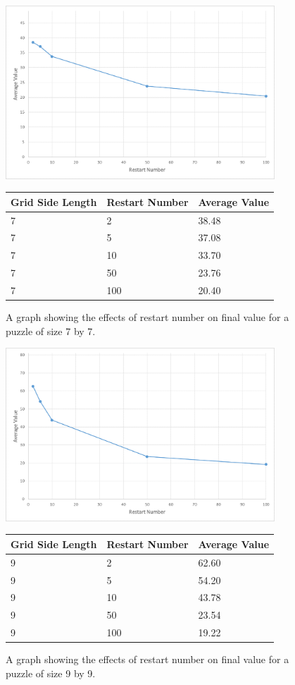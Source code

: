 \documentclass[12pt]{article}
\begin{document}
\begin{figure}[H]
    \centering
    \includegraphics[width=0.9\textwidth]{random_restarts_7x7_restarts_excel}
\begin{tabular}{ |p{4cm}||p{4cm}|p{4cm}|  }
 \hline
Grid Side Length& Restart Number &Average Value\\
 \hline
7&2&38.48\\
7&5&37.08\\
7&10&33.70\\
7&50&23.76\\
7&100&20.40\\
 \hline
\end{tabular}
    \caption{A graph showing the effects of restart number on final value for a puzzle of size 7 by 7.}
    \label{fig:random_restarts_7x7_restarts}
\end{figure}

\begin{figure}[H]
    \centering
    \includegraphics[width=0.9\textwidth]{random_restarts_9x9_restarts_excel}
\begin{tabular}{ |p{4cm}||p{4cm}|p{4cm}|  }
 \hline
Grid Side Length& Restart Number &Average Value\\
 \hline
9&2&62.60\\
9&5&54.20\\
9&10&43.78\\
9&50&23.54\\
9&100&19.22\\
 \hline
\end{tabular}
    \caption{A graph showing the effects of restart number on final value for a puzzle of size 9 by 9.}
    \label{fig:random_restarts_9x9_restarts}
\end{figure}
\end{document}
